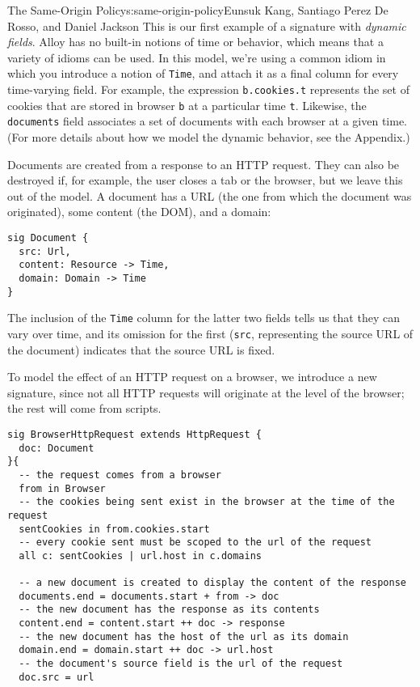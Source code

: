 \begin{aosachapter}{The Same-Origin Policy}{s:same-origin-policy}{Eunsuk Kang, Santiago Perez De Rosso, and Daniel Jackson}
This is our first example of a signature with \emph{dynamic fields}.
Alloy has no built-in notions of time or behavior, which means that a
variety of idioms can be used. In this model, we're using a common idiom
in which you introduce a notion of \texttt{Time}, and attach it as a
final column for every time-varying field. For example, the expression
\texttt{b.cookies.t} represents the set of cookies that are stored in
browser \texttt{b} at a particular time \texttt{t}. Likewise, the
\texttt{documents} field associates a set of documents with each browser
at a given time. (For more details about how we model the dynamic
behavior, see the Appendix.)

Documents are created from a response to an HTTP request. They can also
be destroyed if, for example, the user closes a tab or the browser, but
we leave this out of the model. A document has a URL (the one from which
the document was originated), some content (the DOM), and a domain:

\begin{verbatim}
sig Document {
  src: Url,
  content: Resource -> Time,
  domain: Domain -> Time
}
\end{verbatim}

The inclusion of the \texttt{Time} column for the latter two fields
tells us that they can vary over time, and its omission for the first
(\texttt{src}, representing the source URL of the document) indicates
that the source URL is fixed.

To model the effect of an HTTP request on a browser, we introduce a new
signature, since not all HTTP requests will originate at the level of
the browser; the rest will come from scripts.

\begin{verbatim}
sig BrowserHttpRequest extends HttpRequest {
  doc: Document
}{
  -- the request comes from a browser
  from in Browser
  -- the cookies being sent exist in the browser at the time of the request
  sentCookies in from.cookies.start
  -- every cookie sent must be scoped to the url of the request
  all c: sentCookies | url.host in c.domains

  -- a new document is created to display the content of the response
  documents.end = documents.start + from -> doc
  -- the new document has the response as its contents
  content.end = content.start ++ doc -> response
  -- the new document has the host of the url as its domain
  domain.end = domain.start ++ doc -> url.host
  -- the document's source field is the url of the request
  doc.src = url


\end{verbatim}
\end{aosachapter}
